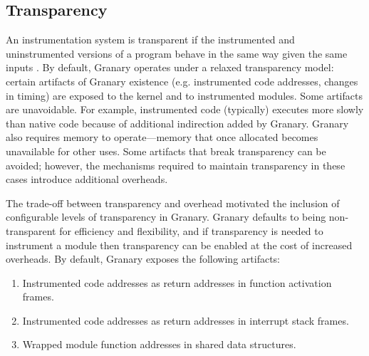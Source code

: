\documentclass[preprint]{sigplanconf}
\begin{document}
\subsection{Transparency}\label{sec:transparency}

An instrumentation system is transparent if the instrumented and uninstrumented versions of a program behave in the same way given the same inputs \cite{Transparency}. By default, Granary operates under a relaxed transparency model: certain artifacts of Granary existence (e.g. instrumented code addresses, changes in timing) are exposed to the kernel and to instrumented modules. Some artifacts are unavoidable. For example, instrumented code (typically) executes more slowly than native code because of additional indirection added by Granary. Granary also requires memory to operate---memory that once allocated becomes unavailable for other uses. Some artifacts that break transparency can be avoided; however, the mechanisms required to maintain transparency in these cases introduce additional overheads.

The trade-off between transparency and overhead motivated the inclusion of configurable levels of transparency in Granary. Granary defaults to being non-transparent for efficiency and flexibility, and if transparency is needed to instrument a module then transparency can be enabled at the cost of increased overheads. By default, Granary exposes the following artifacts: \begin{enumerate}
	\item Instrumented code addresses as return addresses in function activation frames.
	\item Instrumented code addresses as return addresses in interrupt stack frames.
	\item Wrapped module function addresses in shared data structures.
\end{enumerate}

\end{document}
